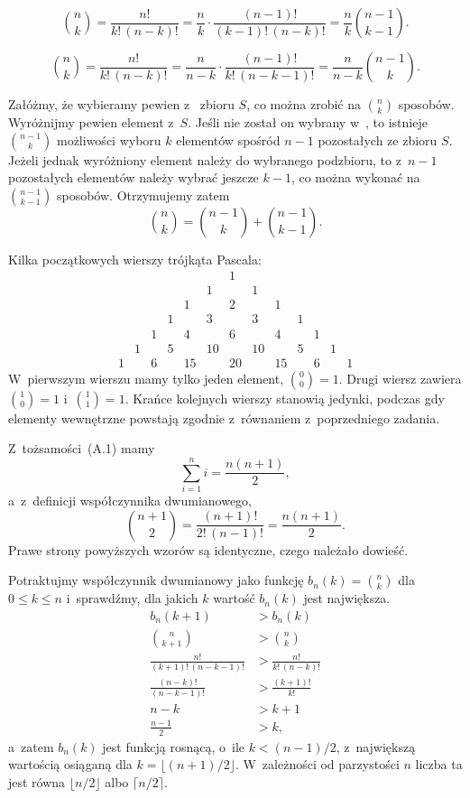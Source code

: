 \exercise{} %
\[
	\binom{n}{k} = \frac{n!}{k!\,(n-k)!} = \frac{n}{k}\cdot\frac{(n-1)!}{(k-1)!\,(n-k)!} = \frac{n}{k}\binom{n-1}{k-1}.
\]

\exercise{} %
\[
	\binom{n}{k} = \frac{n!}{k!\,(n-k)!} = \frac{n}{n-k}\cdot\frac{(n-1)!}{k!\,(n-k-1)!} = \frac{n}{n-k}\binom{n-1}{k}.
\]

\exercise{} %
Załóżmy, że wybieramy pewien  z~ zbioru $S$, co można zrobić na $\binom{n}{k}$ sposobów. Wyróżnijmy pewien element z~$S$. Jeśli nie został on wybrany w~, to istnieje $\binom{n-1}{k}$ możliwości wyboru $k$ elementów spośród $n-1$ pozostałych ze zbioru $S$. Jeżeli jednak wyróżniony element należy do wybranego podzbioru, to z~$n-1$ pozostałych elementów należy wybrać jeszcze $k-1$, co można wykonać na $\binom{n-1}{k-1}$ sposobów. Otrzymujemy zatem
\[
	\binom{n}{k} = \binom{n-1}{k}+\binom{n-1}{k-1}.
\]

\exercise{} %
Kilka początkowych wierszy trójkąta Pascala:
\[
	\begin{array}{ccccccccccccc}
		&&&&&& 1 \\
		&&&&& 1 && 1 \\
		&&&& 1 && 2 && 1 \\
		&&& 1 && 3 && 3 && 1 \\
		&& 1 && 4 && 6 && 4 && 1 \\
		& 1 && 5 && 10 && 10 && 5 && 1 \\
		1 && 6 && 15 && 20 && 15 && 6 && 1
	\end{array}
\]
W~pierwszym wierszu mamy tylko jeden element, $\binom{0}{0}=1$. Drugi wiersz zawiera $\binom{1}{0}=1$ i~$\binom{1}{1}=1$. Krańce kolejnych wierszy stanowią jedynki, podczas gdy elementy wewnętrzne powstają zgodnie z~równaniem z~poprzedniego zadania.

\exercise{} %
Z~tożsamości~(A.1) mamy
\[
	\sum_{i=1}^ni = \frac{n(n+1)}{2},
\]
a~z~definicji współczynnika dwumianowego,
\[
	\binom{n+1}{2} = \frac{(n+1)!}{2!\,(n-1)!} = \frac{n(n+1)}{2}.
\]
Prawe strony powyższych wzorów są identyczne, czego należało dowieść.

\exercise{} %
Potraktujmy współczynnik dwumianowy jako funkcję $b_n(k)=\binom{n}{k}$ dla $0\le k\le n$ i~sprawdźmy, dla jakich $k$ wartość $b_n(k)$ jest największa.
\begin{align*}
	b_n(k+1) &> b_n(k) \\
	\binom{n}{k+1} &> \binom{n}{k} \\
	\frac{n!}{(k+1)!\,(n-k-1)!} &> \frac{n!}{k!\,(n-k)!} \\
	\frac{(n-k)!}{(n-k-1)!} &> \frac{(k+1)!}{k!} \\
	n-k &> k+1 \\
	\frac{n-1}{2} &> k,
\end{align*}
a~zatem $b_n(k)$ jest funkcją rosnącą, o~ile $k<(n-1)/2$, z~największą wartością osiąganą dla $k=\lfloor(n+1)/2\rfloor$. W~zależności od parzystości $n$ liczba ta jest równa $\lfloor n/2\rfloor$ albo $\lceil n/2\rceil$.


